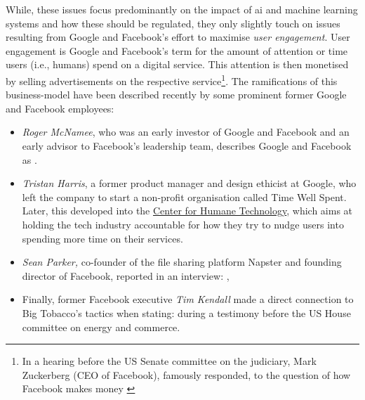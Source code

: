 While, these issues focus predominantly on the impact of \gls{ai} and machine learning systems and how these should be regulated, they only slightly touch on issues resulting from Google and Facebook's effort to maximise \emph{user engagement}. 
User engagement is  Google and Facebook's term for the amount of attention or time users (i.e., humans) spend on a digital service.
This attention is then monetised by selling advertisements on the respective service\footnote{In a hearing before the US Senate committee on the judiciary, Mark Zuckerberg (CEO of Facebook), famously responded, to the question of how Facebook makes money  \citep{ noauthor_senator_2018, noauthor_facebook_2018}}. 
The ramifications of this business-model have been described recently by some prominent former Google and Facebook employees:
\begin{itemize}
    \item \textit{Roger McNamee}, who was an early investor of Google and Facebook and an early advisor to Facebook's leadership team, describes Google and Facebook as  \citep{mcnamee_i_2017}.
    \item \textit{Tristan Harris}, a former product manager and design ethicist at Google, who left the company to start a non-profit organisation called Time Well Spent. Later, this developed into the \href{https://www.humanetech.com/who-we-are}{Center for Humane Technology}, which aims at holding the tech industry accountable for how they try to nudge users into spending more time on their services. \citep{metz_smartphones_2017}
    \item \textit{Sean Parker,} co-founder of the file sharing platform Napster and founding director of Facebook, reported in an interview:  ,  \citep{allen_sean_2017}
    \item Finally, former Facebook executive \textit{Tim Kendall} made a direct connection to Big Tobacco's tactics when stating:  \citep{kendall_house_2020} during a testimony before the US House committee on energy and commerce.
\end{itemize}


